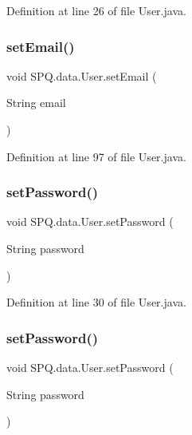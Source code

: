 Definition at line 26 of file User.\+java.

\mbox{\label{class_s_p_q_1_1data_1_1_user_ab7132f971882fb88afc6999cf5473ef4}} 
\subsubsection{\texorpdfstring{set\+Email()}{setEmail()}\hspace{0.1cm}{\footnotesize\ttfamily [4/4]}}
{\footnotesize\ttfamily void S\+P\+Q.\+data.\+User.\+set\+Email (\begin{DoxyParamCaption}\item[{String}]{email }\end{DoxyParamCaption})}



Definition at line 97 of file User.\+java.

\mbox{\label{class_s_p_q_1_1data_1_1_user_aa5bcf362d3c9c4746f406239bcb041f5}} 
\subsubsection{\texorpdfstring{set\+Password()}{setPassword()}\hspace{0.1cm}{\footnotesize\ttfamily [1/4]}}
{\footnotesize\ttfamily void S\+P\+Q.\+data.\+User.\+set\+Password (\begin{DoxyParamCaption}\item[{String}]{password }\end{DoxyParamCaption})}



Definition at line 30 of file User.\+java.

\mbox{\label{class_s_p_q_1_1data_1_1_user_aa5bcf362d3c9c4746f406239bcb041f5}} 
\subsubsection{\texorpdfstring{set\+Password()}{setPassword()}\hspace{0.1cm}{\footnotesize\ttfamily [2/4]}}
{\footnotesize\ttfamily void S\+P\+Q.\+data.\+User.\+set\+Password (\begin{DoxyParamCaption}\item[{String}]{password }\end{DoxyParamCaption})}



